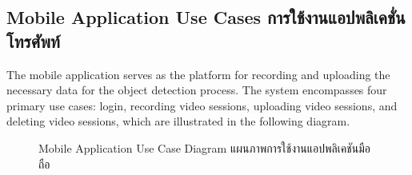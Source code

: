 \subsection{\ifenglish Mobile Application Use Cases \else การใช้งานแอปพลิเคชั่นโทรศัพท์ \fi}
The mobile application serves as the platform for recording and uploading the necessary data for the object detection process. The system encompasses four primary use cases: login, recording video sessions, uploading video sessions, and deleting video sessions, which are illustrated in the following diagram.

\begin{figure}[ht]
    \begin{center}
    
    \end{center}
    \newcommand{\MobileAppUseCaseDiagram}{\ifenglish Mobile Application Use Case Diagram \else แผนภาพการใช้งานแอปพลิเคชันมือถือ\fi}
    \caption[\MobileAppUseCaseDiagram]{\MobileAppUseCaseDiagram}
    \label{fig:mobile app use case diagram}
\end{figure}

